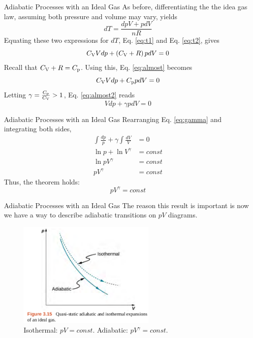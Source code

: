 \documentclass{beamer}
\begin{document}
\begin{frame}{Adiabatic Processes with an Ideal Gas}
\small
As before, differentiating the the idea gas law, assuming both pressure and volume may vary, yields
\begin{equation}
dT = \frac{dp V+pdV}{nR} \label{eq:t2}
\end{equation}
Equating these two expressions for $dT$, Eq. \ref{eq:t1} and Eq. \ref{eq:t2}, gives 
\begin{equation}
C_{\rm V} V dp + \left( C_{\rm V} + R \right) p dV = 0 \label{eq:almost}
\end{equation}
Recall that $C_{\rm V} + R = C_{\rm p}$.  Using this, Eq. \ref{eq:almost} becomes
\begin{equation}
C_{\rm V} V dp + C_{\rm p} p dV = 0 \label{eq:almost2}
\end{equation}
Letting $\gamma = \frac{C_{\rm p}}{C_{\rm V}} > 1$, Eq. \ref{eq:almost2} reads
\begin{equation}
V dp + \gamma p dV = 0 \label{eq:gamma}
\end{equation}
\end{frame}

\begin{frame}{Adiabatic Processes with an Ideal Gas}
Rearranging Eq. \ref{eq:gamma} and integrating both sides,
\begin{align}
\int \frac{dp}{p} + \gamma \int \frac{dV}{V} &= 0 \\
\ln p + \ln V^{\gamma} &= const \\
\ln pV^{\gamma} &= const \\
pV^\gamma &= const
\end{align}
Thus, the theorem holds:
\begin{equation}
\boxed{ pV^\gamma = const}
\end{equation}
\end{frame}

\begin{frame}{Adiabatic Processes with an Ideal Gas}
The reason this result is important is now we have a way to describe adiabatic transitions on $pV$ diagrams.
\begin{figure}
\centering
\includegraphics[width=0.6\textwidth]{figures/adiabatic.png}
\caption{\label{fig:adiabatic} Isothermal: $pV = const$.  Adiabatic: $pV^\gamma = const$.}
\end{figure}
\end{frame}
\end{document}
